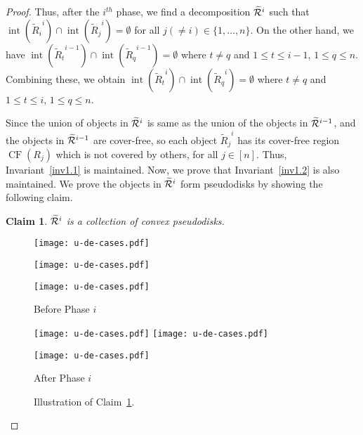 \documentclass[a4paper,11pt]{article}
\DeclareMathOperator{\interior}{int}
\DeclareMathOperator{\CF}{CF}
\newtheorem{claim}{Claim}
\begin{document}
\begin{proof}
Thus, after the 
$i^{th}$ phase, 
we find a decomposition $\widetilde{\cal R}^i$  such that 
$\interior({{\widetilde{R}}_i}^i)\cap \interior({{\widetilde{R}}_j}^i)=\emptyset$ for 
all 
$j(\neq i)\in \{1,\ldots, n\}$. On the other hand, we have 
$\interior({{\widetilde{R}}_t}^{i-1}) \cap  
\interior({{\widetilde{R}}_q}^{i-1})=\emptyset$ where $t\neq q$ and $1\leq t \leq 
i-1$, $1\leq 
q 
\leq n$. Combining these,  we obtain  $\interior({{\widetilde{R}}_t}^i) 
\cap \interior(  
{{\widetilde{R}}_q}^i)=\emptyset$ where $t\neq q$ and $1\leq t \leq i$, $1\leq q 
\leq n$.

Since the union of objects 
in  $\widetilde{\cal R}^{i}$  is same as the 
union of the  objects in  $\widetilde{\cal R}^{i-1}$, and the 
objects in $\widetilde{\cal R}^{i-1}$ are cover-free,  so each object  
${{\widetilde{R}}_j}^{i}$
has its cover-free region $\CF(R_j)$  which is not covered by others, for all $j\in [n]$.  Thus, 
Invariant~\ref{inv1.1} is maintained.
Now, we prove that Invariant~\ref{inv1.2} is also 
maintained.
We prove the objects in 
$\widetilde{\cal R}^i$ form pseudodisks by showing the 
following claim.

\begin{claim}\label{C1}
$\widetilde{\cal R}^i$ is a collection of convex pseudodisks.
\end{claim}


\begin{figure}
  \centering
  \begin{minipage}{.4\linewidth}
    \centering
      {\texttt{[image: u-de-cases.pdf]}}

      {\texttt{[image: u-de-cases.pdf]}}


      {\texttt{[image: u-de-cases.pdf]}}
\caption*{Before Phase $i$}
  \end{minipage}\quad
   \begin{minipage}{.4\linewidth}
    \centering

      {\texttt{[image: u-de-cases.pdf]}}
      {\texttt{[image: u-de-cases.pdf]}}


      {\texttt{[image: u-de-cases.pdf]}}


    \caption*{After Phase $i$}
  \end{minipage}
 \caption{Illustration of Claim~\ref{C1}.}
 \label{figDecompose}


\end{figure}
\end{proof}
\end{document}
